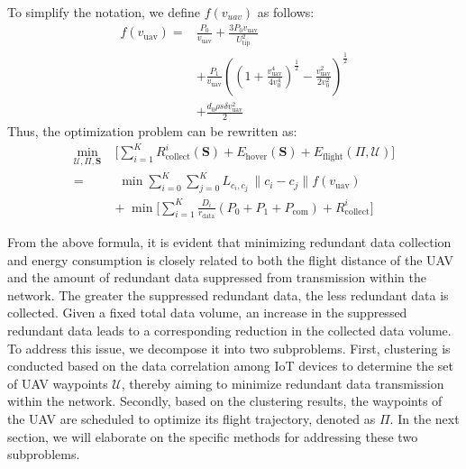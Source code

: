\documentclass[sigconf]{acmart}
\begin{document}
To simplify the notation, we define $f(v_{uav})$ as follows:
\begin{equation}
\begin{aligned}
    f(v_{\mathrm{uav}}) = & \frac{P_0}{v_{\mathrm{uav}}} + \frac{3P_0 v_{\mathrm{uav}}}{U_{\mathrm{tip}}^2} \\
    & + \frac{P_1}{v_{\mathrm{uav}}} \left( \left( 1 + \frac{v_{\mathrm{uav}}^4}{4v_0^4} \right)^{\frac{1}{2}} - \frac{v_{\mathrm{uav}}^2}{2v_0^2} \right)^{\frac{1}{2}} \\
    & + \frac{d_0 \rho s \delta v_{\mathrm{uav}}^2}{2}
\end{aligned}
\end{equation}
Thus, the optimization problem can be rewritten as:
\begin{equation}
\begin{aligned}
\min_{\mathcal{U}, \Pi, \mathbf{S}} \; & \Biggl[ \sum_{i=1}^{K} R_{\mathrm{collect}}^i(\mathbf{S}) + E_{\mathrm{hover}}(\mathbf{S}) + E_{\mathrm{flight}}(\Pi, \mathcal{U}) \Biggr] \\
=& \; \min \sum_{i=0}^{K} \sum_{j=0}^{K} L_{c_i, c_j} \, \|c_i - c_j\| f(v_{\mathrm{uav}}) \\
& + \; \min \Biggl[ \sum_{i=1}^{K} \frac{D_i}{r_{\mathrm{data}}} (P_0 + P_1 + P_{\mathrm{com}}) + R_{\mathrm{collect}}^i \Biggr]
\end{aligned}
\end{equation}

From the above formula, it is evident that minimizing redundant data collection and energy consumption is closely related to both the flight distance of the UAV and the amount of redundant data suppressed from transmission within the network. The greater the suppressed redundant data, the less redundant data is collected. Given a fixed total data volume, an increase in the suppressed redundant data leads to a corresponding reduction in the collected data volume. To address this issue, we decompose it into two subproblems. First, clustering is conducted based on the data correlation among IoT devices to determine the set of UAV waypoints $\mathcal{U}$, thereby aiming to minimize redundant data transmission within the network. Secondly, based on the clustering results, the waypoints of the UAV are scheduled to optimize its flight trajectory, denoted as $\Pi$. In the next section, we will elaborate on the specific methods for addressing these two subproblems.
\end{document}

